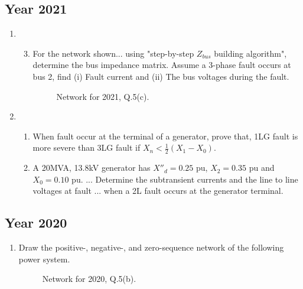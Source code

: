 \documentclass[12pt, a4paper]{article}
\begin{document}
	\subsection{Year 2021}
	\begin{enumerate}[label=\textbf{Q\arabic*.}, wide, labelindent=0pt, start=5]
		\item 
		\begin{enumerate}[label=\textbf{(\alph*)}]
			\setcounter{enumii}{2} %
			\item For the network shown... using "step-by-step $Z_{bus}$ building algorithm", determine the bus impedance matrix. Assume a 3-phase fault occurs at bus 2, find (i) Fault current and (ii) The bus voltages during the fault.
			\begin{figure}[h!]
				\centering
				\caption{Network for 2021, Q.5(c).}
			\end{figure}
		\end{enumerate}
		\item 
		\begin{enumerate}[label=\textbf{(\alph*)}]
			\item When fault occur at the terminal of a generator, prove that, 1LG fault is more severe than 3LG fault if $X_n < \frac{1}{2}(X_1-X_0)$.
			\item A 20MVA, 13.8kV generator has $X''_d = 0.25$ pu, $X_2=0.35$ pu and $X_0=0.10$ pu. ... Determine the subtransient currents and the line to line voltages at fault ... when a 2L fault occurs at the generator terminal.
		\end{enumerate}
	\end{enumerate}
	
	\subsection{Year 2020}
	\begin{enumerate}[label=\textbf{Q.5(b)}, wide, labelindent=0pt]
		\item Draw the positive-, negative-, and zero-sequence network of the following power system.
		\begin{figure}[h!]
			\centering
			\caption{Network for 2020, Q.5(b).}
		\end{figure}
	\end{enumerate}
	
\end{document}
